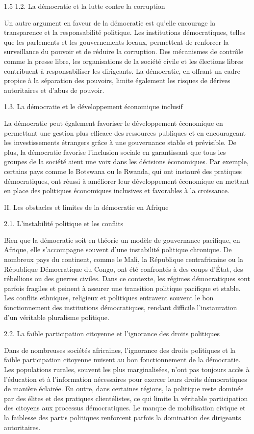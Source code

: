 \documentclass[12pt]{article}
\begin{document}
\begin{spacing}{1.5}
1.2. La démocratie et la lutte contre la corruption
 
Un autre argument en faveur de la démocratie est qu'elle encourage la transparence et la responsabilité politique. Les institutions démocratiques, telles que les parlements et les gouvernements locaux, permettent de renforcer la surveillance du pouvoir et de réduire la corruption. Des mécanismes de contrôle comme la presse libre, les organisations de la société civile et les élections libres contribuent à responsabiliser les dirigeants. La démocratie, en offrant un cadre propice à la séparation des pouvoirs, limite également les risques de dérives autoritaires et d'abus de pouvoir.

1.3. La démocratie et le développement économique inclusif
  
La démocratie peut également favoriser le développement économique en permettant une gestion plus efficace des ressources publiques et en encourageant les investissements étrangers grâce à une gouvernance stable et prévisible. De plus, la démocratie favorise l'inclusion sociale en garantissant que tous les groupes de la société aient une voix dans les décisions économiques. Par exemple, certains pays comme le Botswana ou le Rwanda, qui ont instauré des pratiques démocratiques, ont réussi à améliorer leur développement économique en mettant en place des politiques économiques inclusives et favorables à la croissance.

II. Les obstacles et limites de la démocratie en Afrique

2.1. L'instabilité politique et les conflits

Bien que la démocratie soit en théorie un modèle de gouvernance pacifique, en Afrique, elle s'accompagne souvent d'une instabilité politique chronique. De nombreux pays du continent, comme le Mali, la République centrafricaine ou la République Démocratique du Congo, ont été confrontés à des coups d'État, des rébellions ou des guerres civiles. Dans ce contexte, les régimes démocratiques sont parfois fragiles et peinent à assurer une transition politique pacifique et stable. Les conflits ethniques, religieux et politiques entravent souvent le bon fonctionnement des institutions démocratiques, rendant difficile l'instauration d'un véritable pluralisme politique.

2.2. La faible participation citoyenne et l'ignorance des droits politiques
  
Dans de nombreuses sociétés africaines, l'ignorance des droits politiques et la faible participation citoyenne nuisent au bon fonctionnement de la démocratie. Les populations rurales, souvent les plus marginalisées, n'ont pas toujours accès à l'éducation et à l'information nécessaires pour exercer leurs droits démocratiques de manière éclairée. En outre, dans certaines régions, la politique reste dominée par des élites et des pratiques clientélistes, ce qui limite la véritable participation des citoyens aux processus démocratiques. Le manque de mobilisation civique et la faiblesse des partis politiques renforcent parfois la domination des dirigeants autoritaires.


\end{spacing}
\end{document}
